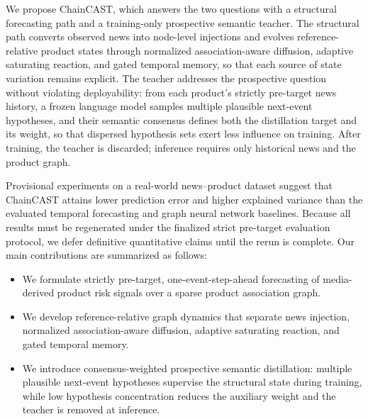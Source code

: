 We propose ChainCAST, which answers the two questions with a structural forecasting path and a training-only prospective semantic teacher. The structural path converts observed news into node-level injections and evolves reference-relative product states through normalized association-aware diffusion, adaptive saturating reaction, and gated temporal memory, so that each source of state variation remains explicit. The teacher addresses the prospective question without violating deployability: from each product's strictly pre-target news history, a frozen language model samples multiple plausible next-event hypotheses, and their semantic consensus defines both the distillation target and its weight, so that dispersed hypothesis sets exert less influence on training. After training, the teacher is discarded; inference requires only historical news and the product graph.

Provisional experiments on a real-world news--product dataset suggest that ChainCAST attains lower prediction error and higher explained variance than the evaluated temporal forecasting and graph neural network baselines. Because all results must be regenerated under the finalized strict pre-target evaluation protocol, we defer definitive quantitative claims until the rerun is complete. Our main contributions are summarized as follows:

\begin{itemize}
    \item We formulate strictly pre-target, one-event-step-ahead forecasting of media-derived product risk signals over a sparse product association graph.
    \item We develop reference-relative graph dynamics that separate news injection, normalized association-aware diffusion, adaptive saturating reaction, and gated temporal memory.
    \item We introduce consensus-weighted prospective semantic distillation: multiple plausible next-event hypotheses supervise the structural state during training, while low hypothesis concentration reduces the auxiliary weight and the teacher is removed at inference.
\end{itemize}
